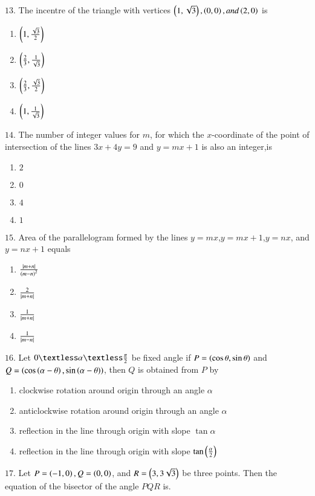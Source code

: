 \documentclass[journal,12pt,twocolumn]{IEEEtran}
\theoremstyle{remark}
\begin{document}
{\begin{enumerate}[label=(\alph*)]
\end{enumerate}
$13.$ The incentre of the triangle with vertices $\left(1,\sqrt{3}\right),\left(0,0\right),and \left(2,0\right)$ is \hfill{}
\begin{enumerate}[label=(\alph*)]
    \item $\left(1,\frac{\sqrt{3}}{2}\right)$
    \item $\left(\frac{2}{3},\frac{1}{\sqrt{3}}\right)$
    \item $\left(\frac{2}{3},\frac{\sqrt{3}}{2}\right)$
    \item $\left(1,\frac{1}{\sqrt{3}}\right)$
\end{enumerate}
$14$. The number of integer values for $m$, for which the $x$-coordinate of the point of intersection of the lines $3x+4y=9$ and $y=mx+1$ is also an integer,is \hfill{}
\begin{enumerate}[label=(\alph*)]
    \item $2$
    \item $0$
    \item $4$
    \item $1$
\end{enumerate}
$15$. Area of the parallelogram formed by the lines $y=mx$,$y=mx+1$,$y=nx$, and $y=nx+1$ equals \hfill{}
\begin{enumerate}[label=(\alph*)]
    \item $\frac{\left\vert m+n\right\vert}{\left(m-n\right)^{2}}$
    \item $\frac{2}{\left\vert m+n\right\vert}$
    \item $\frac{1}{\left\vert m+n\right\vert}$
    \item $\frac{1}{\left\vert m-n\right\vert}$
\end{enumerate}
$16$. Let $0\textless\alpha\textless\frac{\pi}{2}$ be fixed angle if $P=\left(\cos\theta,\sin\theta\right)$ and $Q=\left(\cos\left(\alpha-\theta\right),\sin\left(\alpha-\theta\right)\right)$, then $Q$ is obtained from $P$ by \hfill{}
\begin{enumerate}[label=(\alph*)]
    \item clockwise rotation around origin through an angle $\alpha$
    \item anticlockwise rotation around origin through an angle $\alpha$
    \item reflection in the line through origin with slope $\tan\alpha$
    \item reflection in the line through origin with slope $\tan\left(\frac{\alpha}{2}\right)$
\end{enumerate}
$17$. Let $P=\left(-1,0\right),Q=\left(0,0\right)$, and $R=\left(3,3\sqrt{3}\right)$ be three points. Then the equation of the bisector of the angle $PQR$ is. \hfill{}
}
\end{document}

